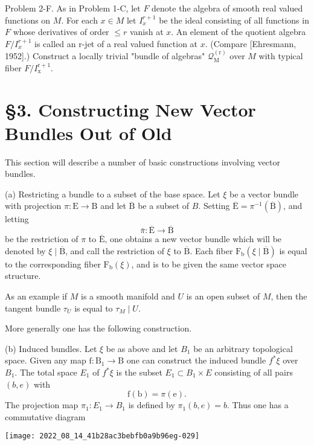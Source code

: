 \documentclass[10pt]{article}
\begin{document}
Problem 2-F. As in Problem 1-C, let $F$ denote the algebra of smooth real valued functions on $M$. For each $x \in M$ let $I_{x}^{r+1}$ be the ideal consisting of all functions in $F$ whose derivatives of order $\leq r$ vanish at $x$. An element of the quotient algebra $F / I_{x}^{r+1}$ is called an r-jet of a real valued function at $x$. (Compare [Ehresmann, 1952].) Construct a locally trivial "bundle of algebras" $\mathcal{Q}_{\mathrm{M}}^{(\mathrm{r})}$ over $M$ with typical fiber $F / I_{\mathrm{x}}^{\mathrm{r}+1}$.

\section{§3. Constructing New Vector Bundles Out of Old}
This section will describe a number of basic constructions involving vector bundles.

(a) Restricting a bundle to a subset of the base space. Let $\xi$ be a vector bundle with projection $\pi: \mathrm{E} \rightarrow \mathrm{B}$ and let $\overline{\mathrm{B}}$ be a subset of $B$. Setting $\overline{\mathrm{E}}=\pi^{-1}(\overline{\mathrm{B}})$, and letting
$$
\bar{\pi}: \overline{\mathrm{E}} \rightarrow \overline{\mathrm{B}}
$$
be the restriction of $\pi$ to $\overline{\mathrm{E}}$, one obtains a new vector bundle which will be denoted by $\xi \mid \overline{\mathrm{B}}$, and call the restriction of $\xi$ to $\overline{\mathrm{B}}$. Each fiber $\mathrm{F}_{\mathrm{b}}(\xi \mid \overline{\mathrm{B}})$ is equal to the corresponding fiber $\mathrm{F}_{\mathrm{b}}(\xi)$, and is to be given the same vector space structure.

As an example if $M$ is a smooth manifold and $U$ is an open subset of $M$, then the tangent bundle $\tau_{U}$ is equal to $\tau_{M} \mid U$.

More generally one has the following construction.

(b) Induced bundles. Let $\xi$ be as above and let $B_{1}$ be an arbitrary topological space. Given any map $\mathrm{f}: \mathrm{B}_{1} \rightarrow \mathrm{B}$ one can construct the induced bundle $f^{*} \xi$ over $B_{1}$. The total space $E_{1}$ of $f^{*} \xi$ is the subset $E_{1} \subset B_{1} \times E$ consisting of all pairs $(b, e)$ with
$$
\mathrm{f}(\mathrm{b})=\pi(\mathrm{e}) .
$$
The projection map $\pi_{1}: E_{1} \rightarrow B_{1}$ is defined by $\pi_{1}(b, e)=b$. Thus one has a commutative diagram

\texttt{[image: 2022\_08\_14\_41b28ac3bebfb0a9b96eg-029]}
\end{document}
